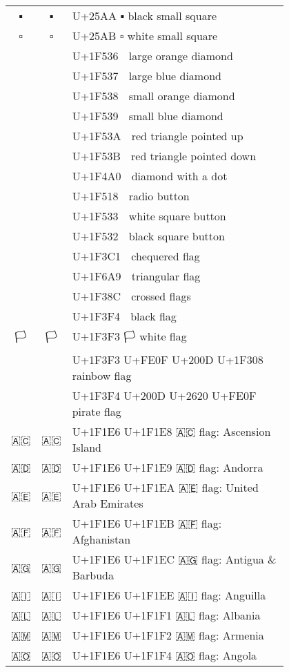 \documentclass[a4paper,12pt]{ltjarticle}
\newcommand{\fontA}[1]{{\fontspec[RawFeature={mode=harf,+dist,+ccmp}]{Segoe UI Emoji} #1}}
\newcommand{\fontB}[1]{{\fontspec[RawFeature={mode=harf,+dist,+ccmp}]{Noto Color Emoji} #1}}
\begin{document}
\begin{longtable}[c]{ccp{0.8\linewidth}}
\fontA{▪}&\fontB{▪}&U+25AA ▪ black small square\\
\fontA{▫}&\fontB{▫}&U+25AB ▫ white small square\\
\fontA{🔶}&\fontB{🔶}&U+1F536 🔶 large orange diamond\\
\fontA{🔷}&\fontB{🔷}&U+1F537 🔷 large blue diamond\\
\fontA{🔸}&\fontB{🔸}&U+1F538 🔸 small orange diamond\\
\fontA{🔹}&\fontB{🔹}&U+1F539 🔹 small blue diamond\\
\fontA{🔺}&\fontB{🔺}&U+1F53A 🔺 red triangle pointed up\\
\fontA{🔻}&\fontB{🔻}&U+1F53B 🔻 red triangle pointed down\\
\fontA{💠}&\fontB{💠}&U+1F4A0 💠 diamond with a dot\\
\fontA{🔘}&\fontB{🔘}&U+1F518 🔘 radio button\\
\fontA{🔳}&\fontB{🔳}&U+1F533 🔳 white square button\\
\fontA{🔲}&\fontB{🔲}&U+1F532 🔲 black square button\\
\fontA{🏁}&\fontB{🏁}&U+1F3C1 🏁 chequered flag\\
\fontA{🚩}&\fontB{🚩}&U+1F6A9 🚩 triangular flag\\
\fontA{🎌}&\fontB{🎌}&U+1F38C 🎌 crossed flags\\
\fontA{🏴}&\fontB{🏴}&U+1F3F4 🏴 black flag\\
\fontA{🏳}&\fontB{🏳}&U+1F3F3 🏳 white flag\\
\fontA{🏳️‍🌈}&\fontB{🏳️‍🌈}&U+1F3F3 U+FE0F U+200D U+1F308 🏳️‍🌈 rainbow flag\\
\fontA{🏴‍☠️}&\fontB{🏴‍☠️}&U+1F3F4 U+200D U+2620 U+FE0F 🏴‍☠️ pirate flag\\
\fontA{🇦🇨}&\fontB{🇦🇨}&U+1F1E6 U+1F1E8 🇦🇨 flag: Ascension Island\\
\fontA{🇦🇩}&\fontB{🇦🇩}&U+1F1E6 U+1F1E9 🇦🇩 flag: Andorra\\
\fontA{🇦🇪}&\fontB{🇦🇪}&U+1F1E6 U+1F1EA 🇦🇪 flag: United Arab Emirates\\
\fontA{🇦🇫}&\fontB{🇦🇫}&U+1F1E6 U+1F1EB 🇦🇫 flag: Afghanistan\\
\fontA{🇦🇬}&\fontB{🇦🇬}&U+1F1E6 U+1F1EC 🇦🇬 flag: Antigua \& Barbuda\\
\fontA{🇦🇮}&\fontB{🇦🇮}&U+1F1E6 U+1F1EE 🇦🇮 flag: Anguilla\\
\fontA{🇦🇱}&\fontB{🇦🇱}&U+1F1E6 U+1F1F1 🇦🇱 flag: Albania\\
\fontA{🇦🇲}&\fontB{🇦🇲}&U+1F1E6 U+1F1F2 🇦🇲 flag: Armenia\\
\fontA{🇦🇴}&\fontB{🇦🇴}&U+1F1E6 U+1F1F4 🇦🇴 flag: Angola\\

\end{longtable}
\end{document}
